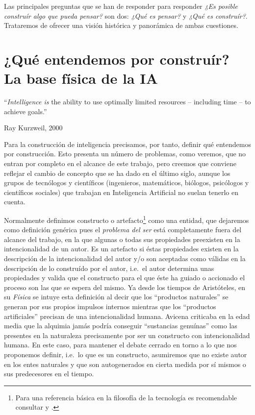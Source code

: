 \documentclass[12pt]{memoir}
\begin{document}
Las principales preguntas que se han de responder para responder \textit{¿Es posible construír algo que pueda pensar?} son dos: \textit{¿Qué es pensar?} y \textit{¿Qué es construír?}. Trataremos de ofrecer una visión histórica y panorámica de ambas cuestiones.

\chapter{¿Qué entendemos por construír?\\La base física de la IA}
\epigraph{``\textit{Intelligence is} the ability to use optimally limited resources – including time – to achieve goals.''}{Ray Kurzweil, 2000}
 

Para la construcción de inteligencia precisamos, por tanto, definir qué entendemos por construcción. Esto presenta un número de problemas, como veremos, que no entran por completo en el alcance de este trabajo, pero creemos que conviene reflejar el cambio de concepto que se ha dado en el último siglo, aunque los grupos de tecnólogos y científicos (ingenieros, matemáticos, biólogos, psicólogos y científicos sociales) que trabajan en Inteligencia Artificial no suelan tenerlo en cuenta. 

Normalmente definimos constructo o artefacto\footnote{Para una referencia básica en la filosofía de la tecnología es recomendable consultar \cite{sep-technology} y \cite{sep-artifact}.} como una entidad, que dejaremos como definición genérica pues el \textit{problema del ser} está completamente fuera del alcance del trabajo, en la que algunas o todas sus propiedades preexisten en la intencionalidad de un autor. Es un artefacto si éstas propiedades existen en la descripción de la intencionalidad del autor y/o son aceptadas como válidas en la descripción de lo construído por el autor, i.e.\ el autor determina unas propiedades y valida que el constructo para el que éste ha guiado o accionado el proceso son las que se espera del mismo. Ya desde los tiempos de Aristóteles, en su \textit{Física} se intuye esta definición al decir que los ``productos naturales'' se generan por sus propios impulsos internos mientras que los ``productos artificiales'' precisan de una intencionalidad humana. Avicena criticaba en la edad media que la alquimia jamás podría conseguir ``sustancias genuínas'' como las presentes en la naturaleza precisamente por ser un constructo con intencionalidad humana. En este caso, para mantener el debate cerrado en torno a lo que nos proponemos definir, i.e.\ lo que es un constructo, asumiremos que no existe autor en los entes naturales y que son autogenerados en cierta medida por sí mismos o sus predecesores en el tiempo.
\end{document}
